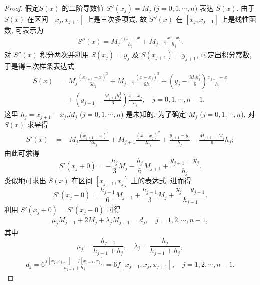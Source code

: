\documentclass[../../main.tex]{subfiles}%
\begin{document}
\begin{proof}
假定$S(x)$ 的二阶导数值 $S''(x_j) = M_j$ ($j = 0, 1, \cdots, n$) 表达 $S(x)$. 由于 $S(x)$ 在区间 $[x_j, x_{j + 1}]$ 上是三次多项式, 故 $S''(x)$ 在 $[x_j, x_{j + 1}]$ 上是线性函数, 可表示为
\begin{align}
S''(x) = M_j \frac{x_{j + 1} - x}{h_j} + M_{j + 1} \frac{x - x_j}{h_j}. \label{eq:数值分析-6.7}
\end{align}
对 $S''(x)$ 积分两次并利用 $S(x_j) = y_j$ 及 $S(x_{j + 1}) = y_{j + 1}$, 可定出积分常数, 于是得三次样条表达式
\begin{align}
S(x) &= M_j \frac{(x_{j + 1} - x)^3}{6 h_j} + M_{j + 1} \frac{(x - x_j)^3}{6 h_j} + \left( y_j - \frac{M_j h_j^2}{6} \right) \frac{x_{j + 1} - x}{h_j} \nonumber \\
&\quad + \left( y_{j + 1} - \frac{M_{j + 1} h_j^2}{6} \right) \frac{x - x_j}{h_j}, \quad j = 0, 1, \cdots, n - 1. \label{eq:数值分析-6.8}
\end{align}
这里 $h_j=x_{j+1}-x_j$,$M_j$ ($j = 0, 1, \cdots, n$) 是未知的. 为了确定 $M_j$ ($j = 0, 1, \cdots, n$), 对 $S(x)$ 求导得
\begin{align}
S'(x) &= -M_j \frac{(x_{j + 1} - x)^2}{2 h_j} + M_{j + 1} \frac{(x - x_j)^2}{2 h_j} + \frac{y_{j + 1} - y_j}{h_j} - \frac{M_{j + 1} - M_j}{6} h_j; \label{eq:数值分析-6.9}
\end{align}
由此可求得
\[
S'(x_j + 0) = -\frac{h_j}{3} M_j - \frac{h_j}{6} M_{j + 1} + \frac{y_{j + 1} - y_j}{h_j}.
\]
类似地可求出 $S(x)$ 在区间 $[x_{j - 1}, x_j]$ 上的表达式, 进而得
\[
S'(x_j - 0) = \frac{h_{j - 1}}{6} M_{j - 1} + \frac{h_{j - 1}}{3} M_j + \frac{y_j - y_{j - 1}}{h_{j - 1}}.
\]
利用 $S'(x_j + 0) = S'(x_j - 0)$ 可得
\begin{align}
\mu_j M_{j - 1} + 2 M_j + \lambda_j M_{j + 1} = d_j, \quad j = 1, 2, \cdots, n - 1, \label{eq:数值分析-6.10}
\end{align}
其中
\[
\mu_j = \frac{h_{j - 1}}{h_{j - 1} + h_j}, \quad \lambda_j = \frac{h_j}{h_{j - 1} + h_j},
\]
\begin{align}
d_j = 6 \frac{f[x_j, x_{j + 1}] - f[x_{j - 1}, x_j]}{h_{j - 1} + h_j} = 6 f[x_{j - 1}, x_j, x_{j + 1}], \quad j = 1, 2, \cdots, n - 1. \label{eq:数值分析-6.11}
\end{align}


\end{proof}
\end{document}
